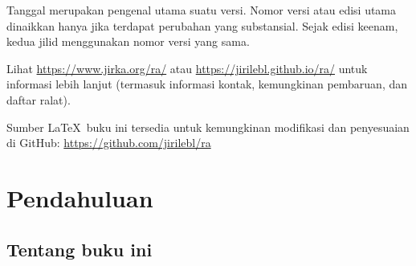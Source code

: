 \documentclass[12pt]{book}
\newcommand{\ignore}[1]{}
\theoremstyle{plain}
\theoremstyle{remark}
\theoremstyle{definition}
\theoremstyle{exercise}
\theoremstyle{example}
\begin{document}
\bigskip

\noindent
Tanggal merupakan pengenal utama suatu versi. Nomor versi atau edisi utama
dinaikkan hanya jika terdapat perubahan yang substansial. Sejak edisi keenam,
kedua jilid menggunakan nomor versi yang sama.

\bigskip

\noindent
Lihat \url{https://www.jirka.org/ra/} atau \url{https://jirilebl.github.io/ra/}
untuk informasi lebih lanjut (termasuk informasi kontak, kemungkinan
pembaruan, dan daftar ralat).


\bigskip

\noindent
Sumber \LaTeX\ buku ini tersedia untuk kemungkinan modifikasi dan penyesuaian
di GitHub: \url{https://github.com/jirilebl/ra}



\tableofcontents
{}

\newpage


\chapter*{Pendahuluan}


\section*{Tentang buku ini}






\end{document}
